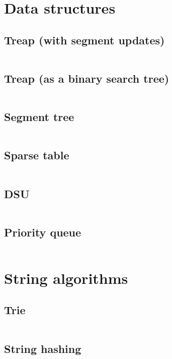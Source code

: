 ﻿\documentclass[10pt,twocolumn,oneside]{article}
\begin{document}
\pagestyle{fancy}
\fancyhead[R]{\thepage}

\section{Data structures}
\subsection{Treap (with segment updates)}
\inputminted[breaklines]{cpp}{Data structures/treap (segment updates).cpp}
\subsection{Treap (as a binary search tree)}
\inputminted[breaklines]{cpp}{Data structures/treap (as a binsearch tree).cpp}
\subsection{Segment tree}
\inputminted[breaklines]{cpp}{Data structures/segment tree.cpp}
\subsection{Sparse table}
\inputminted[breaklines]{cpp}{Data structures/sparse table.cpp}
\subsection{DSU}
\inputminted[breaklines]{cpp}{Data structures/dsu.cpp}
\subsection{Priority queue}
\inputminted[breaklines]{python}{Data structures/priority queue.py}

\section{String algorithms}
\subsection{Trie}
\inputminted[breaklines]{cpp}{String algorithms/trie.cpp}
\subsection{String hashing}
\inputminted[breaklines]{cpp}{String algorithms/string hashing.cpp}
\end{document}
